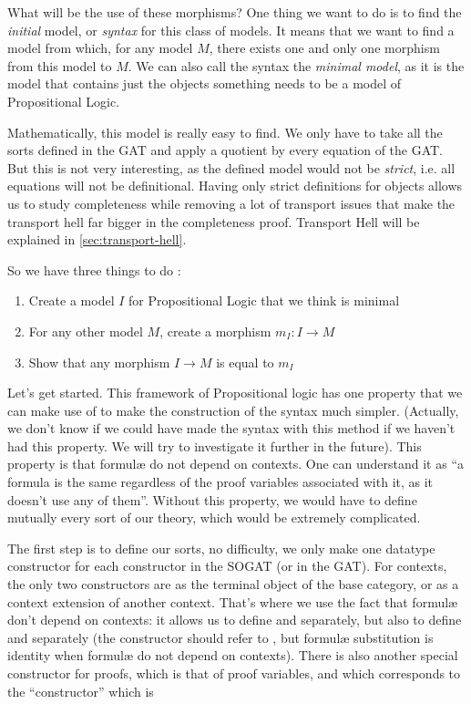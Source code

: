 \documentclass[10pt,a4paper]{article}
\begin{document}
			What will be the use of these morphisms? One thing we want to do is to find the \emph{initial} model, or \emph{syntax} for this class of models. It means that we want to find a model from which, for any model $M$, there exists one and only one morphism from this model to $M$. We can also call the syntax the \emph{minimal model}, as it is the model that contains just the objects something needs to be a model of Propositional Logic.
			
			Mathematically, this model is really easy to find. We only have to take all the sorts defined in the GAT and apply a quotient by every equation of the GAT. But this is not very interesting, as the defined model would not be \emph{strict}, i.e. all equations will not be definitional. Having only strict definitions for objects allows us to study completeness while removing a lot of transport issues that make the transport hell far bigger in the completeness proof. Transport Hell will be explained in \autoref{sec:transport-hell}.
			
			So we have three things to do :
			\begin{enumerate}
				\setlength{\itemsep}{-1ex}
				\item Create a model $I$ for Propositional Logic that we think is minimal
				\item For any other model $M$, create a morphism $m_I : I \to M$
				\item Show that any morphism $I \to M$ is equal to $m_I$
			\end{enumerate}
		
			Let's get started. This framework of Propositional logic has one property that we can make use of to make the construction of the syntax much simpler. (Actually, we don't know if we could have made the syntax with this method if we haven't had this property. We will try to investigate it further in the future). This property is that formulæ do not depend on contexts. One can understand it as \enquote{a formula is the same regardless of the proof variables associated with it, as it doesn't use any of them}. Without this property, we would have to define mutually every sort of our theory, which would be extremely complicated.
			
			The first step is to define our sorts, no difficulty, we only make one datatype constructor for each constructor in the SOGAT (or in the GAT). For contexts, the only two constructors are as the terminal object of the base category, or as a context extension of another context. That's where we use the fact that formulæ don't depend on contexts: it allows us to define  and  separately, but also to define  and  separately (the  constructor should refer to , but formulæ substitution is identity when formulæ do not depend on contexts). There is also another special constructor for proofs, which is that of proof variables, and which corresponds to the \enquote{constructor} which is 
			
\end{document}

